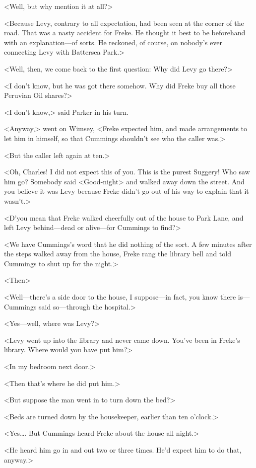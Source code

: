 <Well, but why mention it at all?>

<Because Levy, contrary to all expectation, had been seen at the corner of the road. That was a nasty accident for Freke. He thought it best to be beforehand with an explanation—of sorts. He reckoned, of course, on nobody's ever connecting Levy with Battersea Park.>

<Well, then, we come back to the first question: Why did Levy go there?>

<I don't know, but he was got there somehow. Why did Freke buy all those Peruvian Oil shares?>

<I don't know,> said Parker in his turn.

<Anyway,> went on Wimsey, <Freke expected him, and made arrangements to let him in himself, so that Cummings shouldn't see who the caller was.>

<But the caller left again at ten.>

<Oh, Charles! I did not expect this of you. This is the purest Suggery! Who saw him go? Somebody said <Good-night> and walked away down the street. And you believe it was Levy because Freke didn't go out of his way to explain that it wasn't.>

<D'you mean that Freke walked cheerfully out of the house to Park Lane, and left Levy behind—dead or alive—for Cummings to find?>

<We have Cummings's word that he did nothing of the sort. A few minutes after the steps walked away from the house, Freke rang the library bell and told Cummings to shut up for the night.>

<Then\longdash>

<Well—there's a side door to the house, I suppose—in fact, you know there is—Cummings said so—through the hospital.>

<Yes—well, where was Levy?>

<Levy went up into the library and never came down. You've been in Freke's library. Where would you have put him?>

<In my bedroom next door.>

<Then that's where he did put him.>

<But suppose the man went in to turn down the bed?>

<Beds are turned down by the housekeeper, earlier than ten o'clock.>

<Yes\dots . But Cummings heard Freke about the house all night.>

<He heard him go in and out two or three times. He'd expect him to do that, anyway.>

